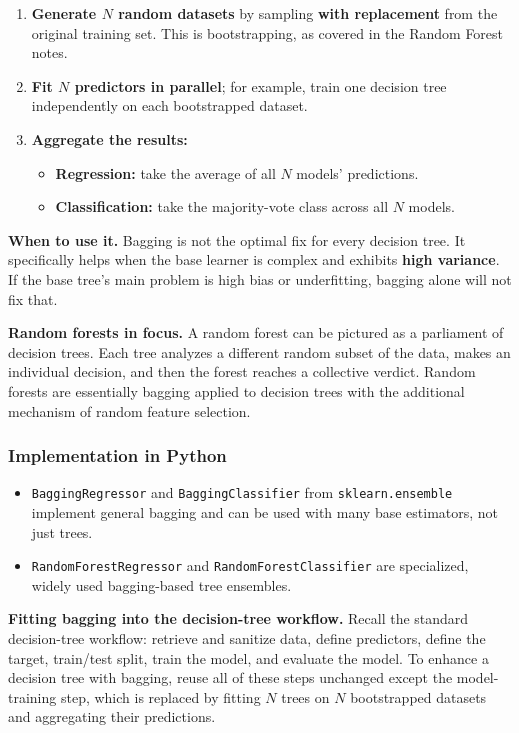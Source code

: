 \documentclass[12pt,openany]{book}
\begin{document}
\begin{enumerate}[leftmargin=*]
    \item \textbf{Generate \(N\) random datasets} by sampling \textbf{with replacement} from the original training set. This is bootstrapping, as covered in the Random Forest notes.
    \item \textbf{Fit \(N\) predictors in parallel}; for example, train one decision tree independently on each bootstrapped dataset.
    \item \textbf{Aggregate the results:}
    \begin{itemize}[leftmargin=*]
        \item \textbf{Regression:} take the average of all \(N\) models' predictions.
        \item \textbf{Classification:} take the majority-vote class across all \(N\) models.
    \end{itemize}
\end{enumerate}

\textbf{When to use it.} Bagging is not the optimal fix for every decision tree. It specifically helps when the base learner is complex and exhibits \textbf{high variance}. If the base tree's main problem is high bias or underfitting, bagging alone will not fix that.

\textbf{Random forests in focus.} A random forest can be pictured as a parliament of decision trees. Each tree analyzes a different random subset of the data, makes an individual decision, and then the forest reaches a collective verdict. Random forests are essentially bagging applied to decision trees with the additional mechanism of random feature selection.

\subsubsection{Implementation in Python}

\begin{itemize}[leftmargin=*]
    \item \texttt{BaggingRegressor} and \texttt{BaggingClassifier} from \texttt{sklearn.ensemble} implement general bagging and can be used with many base estimators, not just trees.
    \item \texttt{RandomForestRegressor} and \texttt{RandomForestClassifier} are specialized, widely used bagging-based tree ensembles.
\end{itemize}

\textbf{Fitting bagging into the decision-tree workflow.} Recall the standard decision-tree workflow: retrieve and sanitize data, define predictors, define the target, train/test split, train the model, and evaluate the model. To enhance a decision tree with bagging, reuse all of these steps unchanged except the model-training step, which is replaced by fitting \(N\) trees on \(N\) bootstrapped datasets and aggregating their predictions.
\end{document}
